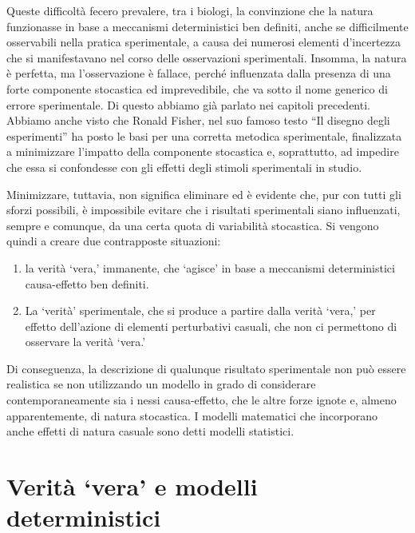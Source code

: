 \documentclass[a4paper,12pt,oneside]{book}
\providecommand{\tightlist}{%
  \setlength{\itemsep}{0pt}\setlength{\parskip}{0pt}}
\begin{document}
Queste difficoltà fecero prevalere, tra i biologi, la convinzione che la natura funzionasse in base a meccanismi deterministici ben definiti, anche se difficilmente osservabili nella pratica sperimentale, a causa dei numerosi elementi d'incertezza che si manifestavano nel corso delle osservazioni sperimentali. Insomma, la natura è perfetta, ma l'osservazione è fallace, perché influenzata dalla presenza di una forte componente stocastica ed imprevedibile, che va sotto il nome generico di errore sperimentale. Di questo abbiamo già parlato nei capitoli precedenti. Abbiamo anche visto che Ronald Fisher, nel suo famoso testo ``Il disegno degli esperimenti'' ha posto le basi per una corretta metodica sperimentale, finalizzata a minimizzare l'impatto della componente stocastica e, soprattutto, ad impedire che essa si confondesse con gli effetti degli stimoli sperimentali in studio.

Minimizzare, tuttavia, non significa eliminare ed è evidente che, pur con tutti gli sforzi possibili, è impossibile evitare che i risultati sperimentali siano influenzati, sempre e comunque, da una certa quota di variabilità stocastica. Si vengono quindi a creare due contrapposte situazioni:

\begin{enumerate}
\def\labelenumi{\arabic{enumi}.}
\tightlist
\item
  la verità `vera,' immanente, che `agisce' in base a meccanismi deterministici causa-effetto ben definiti.
\item
  La `verità' sperimentale, che si produce a partire dalla verità `vera,' per effetto dell'azione di elementi perturbativi casuali, che non ci permettono di osservare la verità `vera.'
\end{enumerate}

Di conseguenza, la descrizione di qualunque risultato sperimentale non può essere realistica se non utilizzando un modello in grado di considerare contemporaneamente sia i nessi causa-effetto, che le altre forze ignote e, almeno apparentemente, di natura stocastica. I modelli matematici che incorporano anche effetti di natura casuale sono detti modelli statistici.

\hypertarget{verituxe0-vera-e-modelli-deterministici}{%
\section{Verità `vera' e modelli deterministici}\label{verituxe0-vera-e-modelli-deterministici}}
\end{document}
